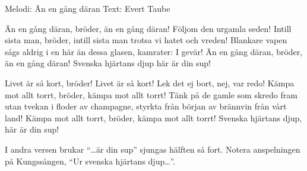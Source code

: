\begin{song}

\begin{songmeta}
Melodi: Än en gång däran
Text: Evert Taube
\end{songmeta}

\begin{songtext}
Än en gång däran, bröder,
än en gång däran!
Följom den urgamla seden!
Intill sista man, bröder,
intill sista man
trotsa vi hatet och vreden!
Blankare vapen sågs aldrig i en här
än dessa glasen, kamrater: I gevär!
Än en gång däran, bröder,
än en gång däran!
Svenska hjärtans djup \textendash{} här är din sup!

Livet är så kort, bröder!
Livet är så kort!
Lek det ej bort, nej, var redo!
Kämpa mot allt torrt, bröder,
kämpa mot allt torrt!
Tänk på de gamle som skredo
fram utan tvekan i floder av champagne,
styrkta från början av brännvin från vårt land!
Kämpa mot allt torrt, bröder,
kämpa mot allt torrt!
Svenska hjärtans djup, här är din sup!
\end{songtext}

\begin{songnotes}
I andra versen brukar \textquotedblleft{}\ldots är din sup\textquotedblright{} sjungas hälften så fort.
Notera anspelningen på Kungssången, \textquotedblleft{}Ur svenska hjärtans djup\ldots\textquotedblright{}.
\end{songnotes}
\end{song}
